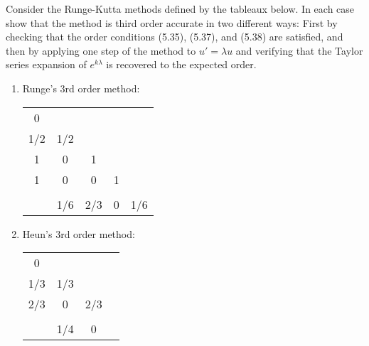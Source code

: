 

Consider the Runge-Kutta methods defined by the tableaux below.  In each
case show that the method is third order accurate in two different ways:
First by checking that the order conditions (5.35), (5.37), and (5.38) are
satisfied, and then by applying one step of
the method to $u' = \lambda u$ and verifying that the Taylor series expansion
of $e^{k\lambda}$ is recovered to the expected order.

\begin{enumerate}
\item Runge's 3rd order method:
\begin{center}
\begin{tabular}{c|cccc}
0\\
1/2&1/2\\
1&0&1\\
1&0&0&1\\
\hline\\
&1/6&2/3&0&1/6
\end{tabular}
\end{center}

\item Heun's 3rd order method:
\begin{center}
\begin{tabular}{c|ccc}
0\\
1/3&1/3\\
2/3&0&2/3\\
\hline\\
&1/4&0
\end{tabular}
\end{center}
\end{enumerate} 
